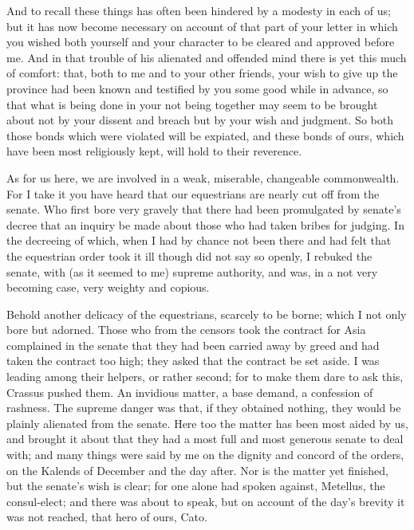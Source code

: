  And to recall these things has often been hindered by a modesty in each of us; but it has now become necessary on account of that part of your letter in which you wished both yourself and your character to be cleared and approved before me. And in that trouble of his alienated and offended mind there is yet this much of comfort: that, both to me and to your other friends, your wish to give up the province had been known and testified by you some good while in advance, so that what is being done in your not being together may seem to be brought about not by your dissent and breach but by your wish and judgment. So both those bonds which were violated will be expiated, and these bonds of ours, which have been most religiously kept, will hold to their reverence.

 As for us here, we are involved in a weak, miserable, changeable commonwealth. For I take it you have heard that our equestrians are nearly cut off from the senate. Who first bore very gravely that there had been promulgated by senate's decree that an inquiry be made about those who had taken bribes for judging. In the decreeing of which, when I had by chance not been there and had felt that the equestrian order took it ill though did not say so openly, I rebuked the senate, with (as it seemed to me) supreme authority, and was, in a not very becoming case, very weighty and copious.

 Behold another delicacy of the equestrians, scarcely to be borne; which I not only bore but adorned. Those who from the censors took the contract for Asia complained in the senate that they had been carried away by greed and had taken the contract too high; they asked that the contract be set aside. I was leading among their helpers, or rather second; for to make them dare to ask this, Crassus pushed them. An invidious matter, a base demand, a confession of rashness. The supreme danger was that, if they obtained nothing, they would be plainly alienated from the senate. Here too the matter has been most aided by us, and brought it about that they had a most full and most generous senate to deal with; and many things were said by me on the dignity and concord of the orders, on the Kalends of December and the day after. Nor is the matter yet finished, but the senate's wish is clear; for one alone had spoken against, Metellus, the consul-elect; and there was about to speak, but on account of the day's brevity it was not reached, that hero of ours, Cato.

